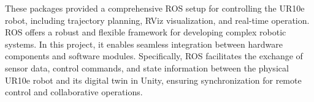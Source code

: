 These packages provided a comprehensive \ac{ROS} setup for controlling the UR10e robot, including trajectory planning, RViz visualization, and real-time operation. 
\ac{ROS} offers a robust and flexible framework for developing complex robotic systems. In this project, it enables seamless integration between hardware components and software modules. Specifically, \ac{ROS} facilitates the exchange of sensor data, control commands, and state information between the physical UR10e robot and its digital twin in Unity, ensuring synchronization for remote control and collaborative operations.



